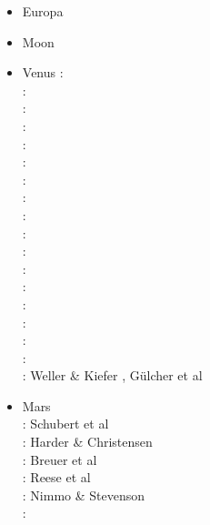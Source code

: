 \begin{itemize}
\item Europa 
{\scriptsize
\cite{shha04,shha05,mish05,hash08}\cite{hash10}\cite{hash11,kast14,almc19}
}
\item Moon 
{\scriptsize
\cite{elvh02}\cite{elhg04}\cite{devv10}\cite{dejv13} \cite{zhdv19}
} 
\item Venus 
{\scriptsize
\nineteenninety: \cite{scbg90,ogaw00}\\
\nineteenninetyone: \cite{lekb91}\\
\nineteenninetytwo: \cite{kiha92,sqjs92}\\
\nineteenninetythree: \cite{kief93,lekb93,ogaw93}\\
\nineteenninetyfive: \cite{lekb95,mopa95}\\
\nineteenninetysix: \cite{somo96}\\
\nineteenninetyeight: \cite{mazk98}\cite{resm98}\cite{moso98}\cite{phha98}\\
\nineteenninetynine: \cite{resm99}\\
\twothousandthree: \cite{vesh03}\\
\twothousandfive: \cite{vavv05}\\
\twothousandten: \cite{stfh10}\\
\twothousandeleven: \cite{orso11}\\
\twothousandtwelve: \cite{arta12}\\
\twothousandthirteen: \cite{huyz13}\\
\twothousandfourteen: \cite{gita14}\cite{gery14b}\\
\twothousandseventeen: \cite{cram17}\cite{dast17}\\
\twothousandeighteen: \cite{king18}\\
\twothousandtwenty: Weller \& Kiefer \cite{weki20}, G{\"u}lcher et al \cite{gugm20}
}
\item Mars \\
{\scriptsize
\nineteenninety: Schubert et al \cite{scbg90}\\
\nineteenninetysix: Harder \& Christensen \cite{hach96}\\
\nineteenninetyseven: Breuer et al \cite{brys97}\\
\nineteenninetyeight: Reese et al \cite{resm98}\\
\twothousandone: Nimmo \& Stevenson \cite{nist01}\\
\twothousandfour: \cite{lenm04}\cite{vavv04c}\\
}
\end{itemize}
